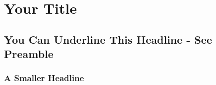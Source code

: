 \chapter{Your Title}

\section{You Can Underline This Headline - See Preamble }

\subsection{A Smaller Headline}








